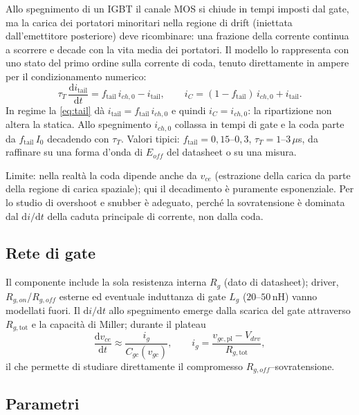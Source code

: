 \documentclass[11pt,a4paper]{article}
\newcommand{\ud}{\mathrm{d}}
\begin{document}
Allo spegnimento di un IGBT il canale MOS si chiude in tempi imposti dal
gate, ma la carica dei portatori minoritari nella regione di drift
(iniettata dall'emettitore posteriore) deve ricombinare: una frazione
della corrente continua a scorrere e decade con la vita media dei
portatori. Il modello lo rappresenta con uno stato del primo ordine
sulla corrente di coda, tenuto direttamente in ampere per il
condizionamento numerico:
\begin{equation}
\tau_T\, \frac{\ud i_{\mathrm{tail}}}{\ud t}
= f_{\mathrm{tail}}\, i_{ch,0} - i_{\mathrm{tail}},
\qquad
i_C = (1 - f_{\mathrm{tail}})\, i_{ch,0} + i_{\mathrm{tail}}.
\label{eq:tail}
\end{equation}
In regime la \eqref{eq:tail} d\`a
$i_{\mathrm{tail}} = f_{\mathrm{tail}}\, i_{ch,0}$ e quindi
$i_C = i_{ch,0}$: la ripartizione non altera la statica. Allo
spegnimento $i_{ch,0}$ collassa in tempi di gate e la coda parte da
$f_{\mathrm{tail}}\, I_0$ decadendo con $\tau_T$. Valori tipici:
$f_{\mathrm{tail}} = 0{,}15$--$0{,}3$, $\tau_T = 1$--$3\,\mu$s, da
raffinare su una forma d'onda di $E_{off}$ del datasheet o su una
misura.

Limite: nella realt\`a la coda dipende anche da $v_{ce}$ (estrazione
della carica da parte della regione di carica spaziale); qui il
decadimento \`e puramente esponenziale. Per lo studio di overshoot e
snubber \`e adeguato, perch\'e la sovratensione \`e dominata dal
$\ud i/\ud t$ della caduta principale di corrente, non dalla coda.

\subsection{Rete di gate}

Il componente include la sola resistenza interna $R_g$ (dato di
datasheet); driver, $R_{g,on}$/$R_{g,off}$ esterne ed eventuale
induttanza di gate $L_g$ ($20$--$50\,$nH) vanno modellati fuori. Il
$\ud i/\ud t$ allo spegnimento emerge dalla scarica del gate attraverso
$R_{g,\mathrm{tot}}$ e la capacit\`a di Miller; durante il plateau
\begin{equation}
\frac{\ud v_{ce}}{\ud t} \approx \frac{i_g}{C_{gc}(v_{gc})},
\qquad
i_g = \frac{v_{ge,\mathrm{pl}} - V_{drv}}{R_{g,\mathrm{tot}}},
\end{equation}
il che permette di studiare direttamente il compromesso
$R_{g,off}$--sovratensione.

\subsection{Parametri}
\end{document}

